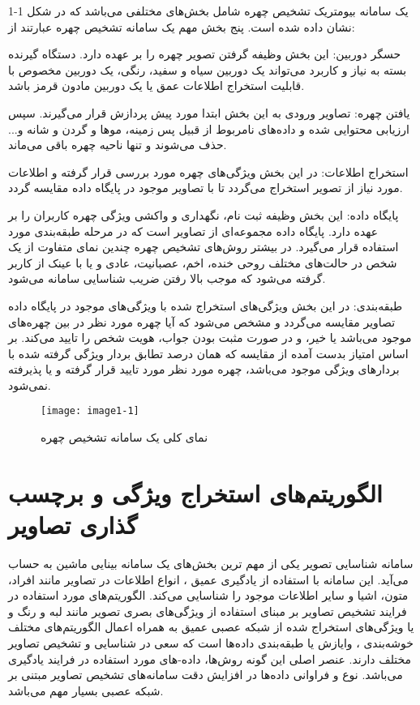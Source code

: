 یک سامانه بیومتریک تشخیص چهره شامل بخش‌های مختلفی می‌باشد که در شکل 1-1 نشان داده شده است. پنج بخش مهم یک سامانه تشخیص چهره عبارتند از:

\noindent
حسگر دوربین: این بخش وظیفه گرفتن تصویر چهره را بر عهده دارد. دستگاه گیرنده بسته به نیاز و کاربرد می‌تواند یک دوربین سیاه و سفید، رنگی، یک دوربین مخصوص با قابلیت استخراج اطلاعات عمق یا یک دوربین مادون قرمز باشد.

\noindent
یافتن چهره: تصاویر ورودی به این بخش ابتدا مورد پیش پردازش قرار می‌گیرند. سپس ارزیابی محتوایی شده و داده‌های نامربوط از قبیل پس زمینه، موها و گردن و شانه و... حذف می‌شوند و تنها ناحیه چهره باقی می‌ماند.

\noindent
استخراج اطلاعات: در این بخش ویژگی‌های چهره مورد بررسی قرار گرفته و اطلاعات مورد نیاز از تصویر استخراج می‌گردد تا با تصاویر موجود در پایگاه داده مقایسه گردد.

\noindent
پایگاه داده: این بخش وظیفه ثبت نام، نگهداری و واکشی ویژگی چهره کاربران را بر عهده دارد. پایگاه داده مجموعه‌ای از تصاویر است که در مرحله طبقه‌بندی مورد استفاده قرار می‌گیرد. در بیشتر روش‌های تشخیص چهره چندین نمای متفاوت از یک شخص در حالت‌های مختلف روحی خنده، اخم، عصبانیت، عادی و یا با عینک از کاربر گرفته می‌شود که موجب بالا رفتن ضریب شناسایی سامانه می‌شود.

\noindent
طبقه‌بندی: در این بخش ویژگی‌های استخراج شده با ویژگی‌های موجود در پایگاه داده تصاویر مقایسه می‌گردد و مشخص می‌شود که آیا چهره مورد نظر در بین چهره‌های موجود می‌باشد یا خیر، و در صورت مثبت بودن جواب، هویت شخص را تایید می‌کند. بر اساس امتیاز بدست آمده از مقایسه که همان درصد تطابق بردار ویژگی گرفته شده با بردارهای ویژگی موجود می‌باشد، چهره مورد نظر مورد تایید قرار گرفته و یا پذیرفته نمی‌شود.

\begin{figure}[!h]
\centering
\texttt{[image: image1-1]}
\caption{ نمای کلی یک سامانه تشخیص چهره \cite{ref20}}
\label{image1-1}
\end{figure}

\section{ الگوریتم‌های استخراج ویژگی و برچسب گذاری تصاویر }
سامانه شناسایی تصویر یکی از مهم ترین بخش‌های یک سامانه بینایی ماشین به حساب می‌آید. این سامانه با استفاده از یادگیری عمیق ، انواع اطلاعات در تصاویر مانند افراد، متون، اشیا و سایر اطلاعات موجود را شناسایی می‌کند. 
الگوریتم‌های مورد استفاده در فرایند تشخیص تصاویر بر مبنای استفاده از ویژگی‌های بصری تصویر مانند لبه و رنگ و یا ویژگی‌های استخراج شده از شبكه‌ عصبی عمیق  به همراه اعمال الگوریتم‌های مختلف خوشه‌بندی ، وایازش  یا طبقه‌بندی  داده‌ها است که سعی در شناسایی و تشخیص تصاویر مختلف دارند. عنصر اصلی این گونه روش‌ها، داده-های مورد استفاده در فرایند یادگیری می‌باشد. نوع و فراوانی داده‌ها در افزایش دقت سامانه‌های تشخیص تصاویر مبتنی بر شبكه‌ عصبی بسیار مهم می‌باشد.


